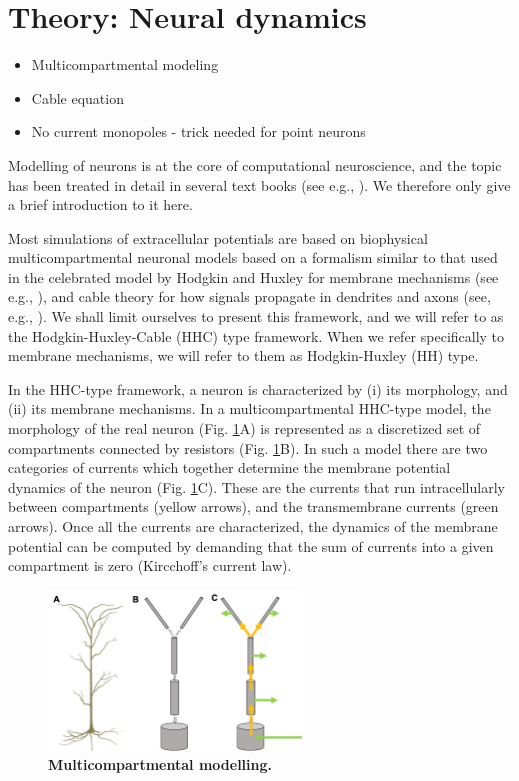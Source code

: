 \section{Theory: Neural dynamics}
\label{sec:Neuron}
\begin{itemize}
\item Multicompartmental modeling
\item Cable equation
\item No current monopoles - trick needed for point neurons
\end{itemize}

Modelling of neurons is at the core of computational neuroscience, and the topic has been treated in detail in several text books (see e.g., \cite{johnston1994foundations, KockSegev1998, Koch1999, Hille2001, Dayan2005, Sterratt2011}). We therefore only give a brief introduction to it here. 

Most simulations of extracellular potentials are based on biophysical multicompartmental neuronal models based on a formalism similar to that used in the celebrated model by Hodgkin and Huxley for membrane mechanisms (see e.g., \cite{Hodgkin1952, KockSegev1998, Pospischil2008}), and cable theory for how signals propagate in dendrites and axons (see, e.g., \cite{koch1999, rall2011}). We shall limit ourselves to present this framework, and we will refer to as the Hodgkin-Huxley-Cable (HHC) type framework. When we refer specifically to membrane mechanisms, we will refer to them as Hodgkin-Huxley (HH) type.

In the HHC-type framework, a neuron is characterized by (i) its morphology, and (ii) its membrane mechanisms. In a multicompartmental HHC-type model, the morphology of the real neuron (Fig. \ref{Neuron:fig:multicomp}A) is represented as a discretized set of compartments connected by resistors (Fig. \ref{Neuron:fig:multicomp}B). In such a model there are two categories of currents which together determine the membrane potential dynamics of the neuron (Fig. \ref{Neuron:fig:multicomp}C). These are the currents that run intracellularly between compartments (yellow arrows), and the transmembrane currents (green arrows). Once all the currents are characterized, the dynamics of the membrane potential can be computed by demanding that the sum of currents into a given compartment is zero (Kircchoff's current law). 

\begin{figure}[!ht]
\begin{center}
\includegraphics[width=0.6\textwidth]{Figures/Neuron/Multicomp.png}
\end{center}
\caption{\textbf{Multicompartmental modelling.} 
}
\label{Neuron:fig:multicomp}
\end{figure}


